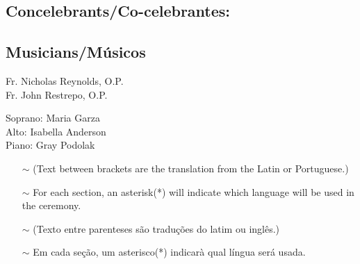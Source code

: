 \documentclass[10pt,a4]{article}
\newcommand \subsect[2] {\subsection*{#1} \switchcolumn \subsection*{#2} \switchcolumn*}
\newcommand{\sectionlinetwo}[2]{%
  \nointerlineskip \vspace{.5\baselineskip}\hspace{\fill}
  {\resizebox{0.75\linewidth}{1.2ex}
    {\pgfornament[color = #1]{#2}
    }}%
    \hspace{\fill}
    \par\nointerlineskip \vspace{.5\baselineskip}
  }
\begin{document}
\massenglish




\begin{paracol}{2}
	\subsect{Concelebrants/Co-celebrantes:}{Musicians/M\'usicos}

	\hspace*{2em}Fr. Nicholas Reynolds, O.P. \\
	\hspace*{2em}Fr. John Restrepo, O.P.

	\switchcolumn

	\hspace*{2em} Soprano: 	Maria Garza \\
	\hspace*{2em} Alto: 	Isabella Anderson \\
	\hspace*{2em} Piano: 	Gray Podolak

	\switchcolumn*

	\begin{itemize}
		\item[$\sim$] (Text between brackets are the translation from the Latin or Portuguese.)
		\item[$\sim$] For each section, an asterisk(*) will indicate which language will be used in the ceremony.
	\end{itemize}

	\switchcolumn


	\begin{itemize}
		\item[$\sim$] (Texto entre parenteses s\~ao tradu\c{c}\~oes do latim ou ingl\^es.) \\
		\item[$\sim$] Em cada se\c{c}\~ao, um asterisco(*) indicar\`a qual l\'ingua ser\'a usada.
	\end{itemize}

\end{paracol}
\sectionlinetwo{black}{89}
\end{document}
